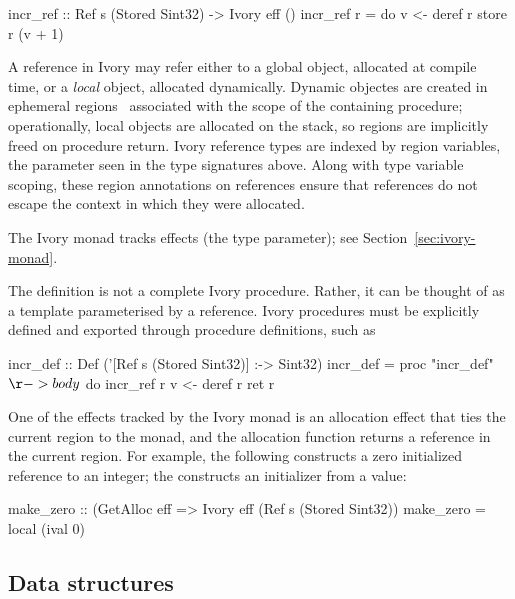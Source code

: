 \begin{code}
incr_ref :: Ref s (Stored Sint32) -> Ivory eff ()
incr_ref r = do
    v <- deref r
    store r (v + 1)
\end{code}

\noindent
A reference in Ivory may refer either to a global object, allocated at
compile time, or a \emph{local} object, allocated dynamically.
Dynamic objectes are created in ephemeral regions~\cite{memareas} associated
with the scope of the containing procedure; operationally, local
objects are allocated on the stack, so regions are implicitly freed
on procedure return.  Ivory reference types are indexed by region
variables, the parameter  seen in the type signatures above.
Along with type variable scoping, these region annotations on
references ensure that references do not escape the context in which
they were allocated.

The Ivory monad tracks effects (the  type parameter); see Section~\ref{sec:ivory-monad}.

The definition  is not a complete Ivory procedure.
Rather, it can be thought of as a template parameterised by a reference.
Ivory procedures must be explicitly defined and exported through
procedure definitions, such as
\begin{code}
incr_def :: Def ('[Ref s (Stored Sint32)] :-> Sint32)
incr_def = proc "incr_def" $ \r -> body $ do
  incr_ref r
  v <- deref r
  ret r
\end{code}

One of the effects tracked by the Ivory monad is an allocation effect that ties the
current region to the monad, and the allocation function  returns a
reference in the current region.  For example, the following constructs a zero
initialized reference to an integer; the  constructs an initializer
from a value:
\begin{code}
make_zero :: (GetAlloc eff %
             => Ivory eff (Ref s (Stored Sint32))
make_zero = local (ival 0)
\end{code}

\subsection{Data structures}

